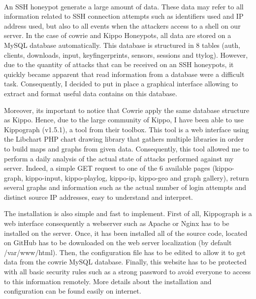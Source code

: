 \paragraph{}

An SSH honeypot generate a large amount of data. These data may refer to all information
related to SSH connection attempts such as identifiers used and IP address used, but also
to all events when the attackers access to a shell on our server.
In the case of cowrie and Kippo Honeypots, all data are stored on a MySQL database automatically.
This database is structured in 8 tables (auth, clients, downloads, input, keyfingerprints,
sensors, sessions and ttylog). However, due to the quantity of attacks that can be received
on an SSH honeypots, it quickly became apparent that read information from a database were a 
difficult task.
Consequently, I decided to put in place a graphical interface allowing to extract and format
useful data contains on this database.

Moreover, its important to notice that Cowrie apply the same database structure as Kippo.
Hence, due to the large community of Kippo, I have been able to use Kippograph (v1.5.1), a
tool from their toolbox.
This tool is a web interface using the Libchart PHP chart drawing library that gathers multiple
libraries in order to build maps and graphs from given data. Consequently, this tool allowed me
to perform a daily analysis of the actual state of attacks performed against my server.
Indeed, a simple GET request to one of the 6 available pages (kippo-graph, kippo-input,
kippo-playlog, kippo-ip, kippo-geo and graph gallery), return several graphs and information
such as the actual number of login attempts and distinct source IP addresses, easy to understand
and interpret.

The installation is also simple and fast to implement. First of all, Kippograph is a web interface
consequently a webserver such as Apache or Nginx has to be installed on the server. Once, it
has been installed all of the source code, located on GitHub has to be downloaded on the web server
localization (by default /var/www/html). Then, the configuration file has to be edited to 
allow it to get data from the cowrie MySQL database.
Finally, this website has to be protected with all basic security rules such as a strong
password to avoid everyone to access to this information remotely. More details about
the installation and configuration can be found easily on internet.



